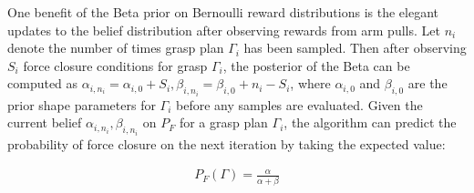 \documentclass[journal,transmag]{IEEEtran}%
\begin{document}

One benefit of the Beta prior on Bernoulli reward distributions is the elegant updates to the belief distribution after observing rewards from arm pulls.
Let $n_i$ denote the number of times grasp plan $\Gamma_i$ has been sampled.
Then after observing $S_i$ force closure conditions for grasp $\Gamma_i$, the posterior of the Beta can be computed as $\alpha_{i, n_i} = \alpha_{i, 0} + S_i, \beta_{i, n_i} = \beta_{i, 0} + n_i - S_i$, where $\alpha_{i,0}$ and $\beta_{i,0}$ are the prior shape parameters for $\Gamma_i$ before any samples are evaluated.
Given the current belief $\alpha_{i, n_i}, \beta_{i, n_i}$ on $P_F$ for a grasp plan $\Gamma_i$, the algorithm can predict the probability of force closure on the next iteration by taking the expected value:

\vspace{-2ex}
\begin{align}\label{eq:shape_sampling}
P_F(\Gamma) = \frac{\alpha}{\alpha + \beta}
\end{align}
\end{document}
